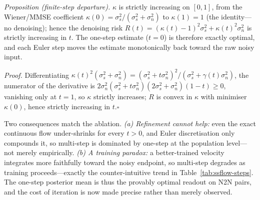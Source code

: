 \documentclass[letterpaper]{article} %
\begin{document}
\emph{Proposition (finite-step departure).}  $\kappa$ is strictly increasing on
$[0,1]$, from the Wiener/MMSE coefficient
$\kappa(0)=\sigma_s^2/(\sigma_s^2+\sigma_n^2)$ to $\kappa(1)=1$ (the identity---no
denoising); hence the denoising risk
$R(t)=(\kappa(t)-1)^2\sigma_s^2+\kappa(t)^2\sigma_n^2$ is strictly increasing in
$t$.  The one-step estimate ($t{=}0$) is therefore exactly optimal, and each
Euler step moves the estimate monotonically back toward the raw noisy input.

\emph{Proof.}  Differentiating
$\kappa(t)^2(\sigma_s^2+\sigma_n^2)=(\sigma_s^2+t\sigma_n^2)^2/(\sigma_s^2+\gamma(t)\sigma_n^2)$,
the numerator of the derivative is
$2\sigma_n^2(\sigma_s^2+t\sigma_n^2)(2\sigma_s^2+\sigma_n^2)(1-t)\ge0$, vanishing
only at $t{=}1$, so $\kappa$ strictly increases; $R$ is convex in $\kappa$ with
minimiser $\kappa(0)$, hence strictly increasing in $t$.\hfill$\square$

Two consequences match the ablation.  \emph{(a) Refinement cannot help:} even the
exact continuous flow under-shrinks for every $t>0$, and Euler
discretisation only compounds it, so multi-step is dominated by one-step at the
population level---not merely empirically.  \emph{(b) A training paradox:} a
better-trained velocity integrates more faithfully toward the noisy
endpoint, so multi-step degrades as training proceeds---exactly the
counter-intuitive trend in Table~\ref{tab:ssflow-steps}.  The one-step posterior
mean is thus the provably optimal readout on N2N pairs, and the cost of iteration
is now made precise rather than merely observed.
\end{document}
